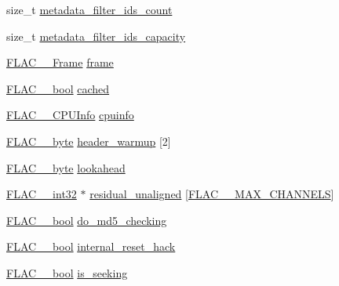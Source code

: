 \begin{DoxyCompactItemize}
size\+\_\+t \hyperlink{struct_f_l_a_c_____stream_decoder_private_a4c0d3dcc57cdbccc06c3e98c4aa4d547}{metadata\+\_\+filter\+\_\+ids\+\_\+count}
\item 
size\+\_\+t \hyperlink{struct_f_l_a_c_____stream_decoder_private_a622f5fb1e25a82a422a8cd2c2195757f}{metadata\+\_\+filter\+\_\+ids\+\_\+capacity}
\item 
\hyperlink{struct_f_l_a_c_____frame}{F\+L\+A\+C\+\_\+\+\_\+\+Frame} \hyperlink{struct_f_l_a_c_____stream_decoder_private_a2089f858bf74312c21e68bd5de431219}{frame}
\item 
\hyperlink{ordinals_8h_a95103469f1cbd78b8cf250194985b34e}{F\+L\+A\+C\+\_\+\+\_\+bool} \hyperlink{struct_f_l_a_c_____stream_decoder_private_a160c321d8b0ce2945dedc703bc5e7340}{cached}
\item 
\hyperlink{struct_f_l_a_c_____c_p_u_info}{F\+L\+A\+C\+\_\+\+\_\+\+C\+P\+U\+Info} \hyperlink{struct_f_l_a_c_____stream_decoder_private_af6aa03bcde7829aed52cdb2c770ae66d}{cpuinfo}
\item 
\hyperlink{ordinals_8h_a5eb569b12d5b047cdacada4d57924ee3}{F\+L\+A\+C\+\_\+\+\_\+byte} \hyperlink{struct_f_l_a_c_____stream_decoder_private_a91bc66ef904d099020ddc6f8ecfe5c8c}{header\+\_\+warmup} \mbox{[}2\mbox{]}
\item 
\hyperlink{ordinals_8h_a5eb569b12d5b047cdacada4d57924ee3}{F\+L\+A\+C\+\_\+\+\_\+byte} \hyperlink{struct_f_l_a_c_____stream_decoder_private_ac5f013412d70baa1bc5a45c1bf063b32}{lookahead}
\item 
\hyperlink{ordinals_8h_a33fd77bfe6d685541a0c034a75deccdc}{F\+L\+A\+C\+\_\+\+\_\+int32} $\ast$ \hyperlink{struct_f_l_a_c_____stream_decoder_private_aad3589a071c64ceccc3bce9c91848722}{residual\+\_\+unaligned} \mbox{[}\hyperlink{group__flac__format_ga488aa5678a58d08f984f5d39185b763d}{F\+L\+A\+C\+\_\+\+\_\+\+M\+A\+X\+\_\+\+C\+H\+A\+N\+N\+E\+LS}\mbox{]}
\item 
\hyperlink{ordinals_8h_a95103469f1cbd78b8cf250194985b34e}{F\+L\+A\+C\+\_\+\+\_\+bool} \hyperlink{struct_f_l_a_c_____stream_decoder_private_a41cf8f5614e5210e5535947705d7b855}{do\+\_\+md5\+\_\+checking}
\item 
\hyperlink{ordinals_8h_a95103469f1cbd78b8cf250194985b34e}{F\+L\+A\+C\+\_\+\+\_\+bool} \hyperlink{struct_f_l_a_c_____stream_decoder_private_a55f163ead76abb029c6ab856d8012e7e}{internal\+\_\+reset\+\_\+hack}
\item 
\hyperlink{ordinals_8h_a95103469f1cbd78b8cf250194985b34e}{F\+L\+A\+C\+\_\+\+\_\+bool} \hyperlink{struct_f_l_a_c_____stream_decoder_private_a7563f6dbc38ab80cc448ac300c183c30}{is\+\_\+seeking}

\end{DoxyCompactItemize}
